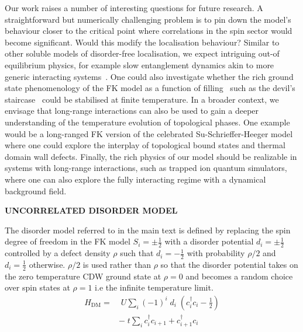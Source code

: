 Our work raises a number of interesting questions for future research. A straightforward but numerically challenging problem is to pin down the model's behaviour closer to the critical point where correlations in the spin sector would become significant. Would this modify the localisation behaviour? Similar to other soluble models of disorder-free localisation, we expect intriguing out-of equilibrium physics, for example slow entanglement dynamics akin to more generic interacting systems~\autocite{hartLogarithmicEntanglementGrowth2020}. One could also investigate whether the rich ground state phenomenology of the FK model as a function of filling~\autocite{gruberGroundStatesSpinless1990} such as the devil's staircase~\autocite{michelettiCompleteDevilTextquotesingles1997} could be stabilised at finite temperature. In a broader context, we envisage that long-range interactions can also be used to gain a deeper understanding of the temperature evolution of topological phases. One example would be a long-ranged FK version of the celebrated Su-Schrieffer-Heeger model where one could explore the interplay of topological bound states and thermal domain wall defects. Finally, the rich physics of our model should be realizable in systems with long-range interactions, such as trapped ion quantum simulators, where one can also explore the fully interacting regime with a dynamical background field.

\textbf{UNCORRELATED DISORDER MODEL}

The disorder model referred to in the main text is defined by replacing the spin degree of freedom in the FK model \(S_i = \pm \tfrac{1}{2}\) with a disorder potential \(d_i = \pm \tfrac{1}{2}\) controlled by a defect density \(\rho\) such that \(d_i = -\tfrac{1}{2}\) with probability \(\rho/2\) and \(d_i = \tfrac{1}{2}\) otherwise. \(\rho/2\) is used rather than \(\rho\) so that the disorder potential takes on the zero temperature CDW ground state at \(\rho = 0\) and becomes a random choice over spin states at \(\rho = 1\) i.e the infinite temperature limit. ~ \[\begin{aligned}
H_{\mathrm{DM}} = & \;U \sum_{i} (-1)^i \; d_i \;(c^\dag_{i}c_{i} - \tfrac{1}{2}) \\
& -\;t \sum_{i} c^\dag_{i}c_{i+1} + c^\dag_{i+1}c_{i} \nonumber\end{aligned}\]

\begin{Shaded}
\begin{Highlighting}[]

\end{Highlighting}
\end{Shaded}
